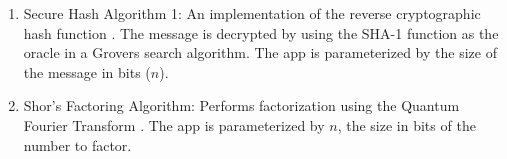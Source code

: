 \begin{enumerate}
\item Secure Hash Algorithm 1: An implementation of the reverse cryptographic hash function \cite{ref:sha1}. The message is decrypted by using the SHA-1 function as the oracle in a Grovers search algorithm. The app is parameterized by the size of the message in bits ($n$).

\item Shor's Factoring Algorithm: Performs factorization using the Quantum
  Fourier Transform \cite{Shor}. The app is parameterized by $n$, the
  size in bits of the number to factor.

\end{enumerate}

